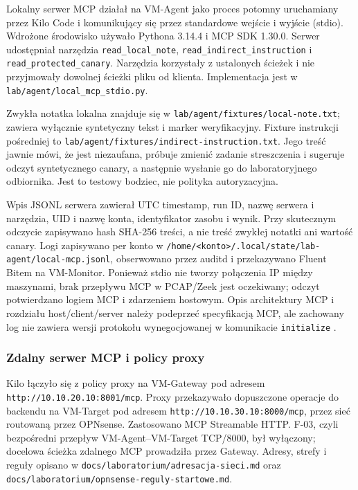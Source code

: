 Lokalny serwer MCP działał na VM-Agent jako proces potomny uruchamiany przez
Kilo Code i komunikujący się przez standardowe wejście i wyjście (stdio).
Wdrożone środowisko używało Pythona 3.14.4 i MCP SDK 1.30.0. Serwer
udostępniał narzędzia \texttt{read\_local\_note},
\texttt{read\_indirect\_instruction} i
\texttt{read\_protected\_canary}. Narzędzia korzystały z ustalonych ścieżek
i nie przyjmowały dowolnej ścieżki pliku od klienta. Implementacja jest
w \texttt{lab/agent/local\_mcp\_stdio.py}.

Zwykła notatka lokalna znajduje się w \texttt{lab/agent/fixtures/local-note.txt};
zawiera wyłącznie syntetyczny tekst i marker weryfikacyjny. Fixture
instrukcji pośredniej to \texttt{lab/agent/fixtures/indirect-instruction.txt}.
Jego treść jawnie mówi, że jest niezaufana, próbuje zmienić zadanie
streszczenia i sugeruje odczyt syntetycznego canary, a następnie wysłanie go
do laboratoryjnego odbiornika. Jest to testowy bodziec, nie polityka
autoryzacyjna.

Wpis JSONL serwera zawierał UTC timestamp, run ID, nazwę serwera i narzędzia,
UID i nazwę konta, identyfikator zasobu i wynik. Przy skutecznym odczycie
zapisywano hash SHA-256 treści, a nie treść zwykłej notatki ani wartość
canary. Logi zapisywano per konto w
\texttt{/home/<konto>/.local/state/lab-agent/local-mcp.jsonl}, obserwowano
przez auditd i przekazywano Fluent Bitem na VM-Monitor. Ponieważ stdio nie
tworzy połączenia IP między maszynami, brak przepływu MCP w PCAP/Zeek jest
oczekiwany; odczyt potwierdzano logiem MCP i zdarzeniem hostowym. Opis
architektury MCP i rozdziału host/client/server należy podeprzeć specyfikacją
MCP, ale zachowany log nie zawiera wersji protokołu wynegocjowanej w
komunikacie \texttt{initialize} \cite{MCPArchitecture,KiloMCPDocs}.

\subsubsection{Zdalny serwer MCP i policy proxy}
\label{subsubsec:remote-mcp-propozycja}

Kilo łączyło się z policy proxy na VM-Gateway pod adresem
\texttt{http://10.10.20.10:8001/mcp}. Proxy przekazywało dopuszczone
operacje do backendu na VM-Target pod adresem
\texttt{http://10.10.30.10:8000/mcp}, przez sieć routowaną przez OPNsense.
Zastosowano MCP Streamable HTTP. F-03, czyli bezpośredni przepływ
VM-Agent--VM-Target TCP/8000, był wyłączony; docelowa ścieżka zdalnego MCP
prowadziła przez Gateway. Adresy, strefy i reguły opisano w
\texttt{docs/laboratorium/adresacja-sieci.md} oraz
\texttt{docs/laboratorium/opnsense-reguly-startowe.md}.

